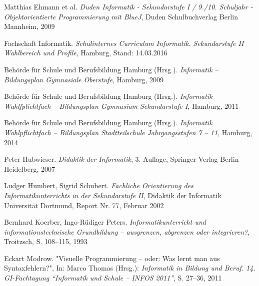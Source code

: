 \begin{thebibliography}{ABCDEF}
Matthias Ehmann et al. \emph{Duden Informatik - Sekundarstufe I / 9./10. Schuljahr - Objektorientierte Programmierung mit BlueJ}, Duden Schulbuchverlag Berlin Mannheim, 2009

Fachschaft Informatik. \emph{Schulinternes Curriculum Informatik. Sekundarstufe II Wahlbereich und Profile}, Hamburg, Stand: 14.03.2016


Behörde für Schule und Berufsbildung Hamburg (Hrsg.). \emph{Informatik -- Bildungsplan  Gymnasiale Oberstufe}, Hamburg, 2009

Behörde für Schule und Berufsbildung Hamburg (Hrsg.). \emph{Informatik Wahlfplichtfach -- Bildungsplan Gymnasium Sekundarstufe I}, Hamburg, 2011

Behörde für Schule und Berufsbildung Hamburg (Hrsg.). \emph{Informatik Wahlpflichtfach -- Bildungsplan Stadtteilschule Jahrgangsstufen 7 -- 11}, Hamburg, 2014

Peter Hubwieser. \emph{Didaktik der Informatik}, 3. Auflage, Springer-Verlag Berlin Heidelberg, 2007

Ludger Humbert, Sigrid Schubert. \emph{Fachliche Orientierung des Informatikunterrichts in der Sekundarstufe II}, Didaktik der Informatik Universität Dortmund, Report Nr. 77, Februar 2002

Bernhard Koerber, Ingo-Rüdiger Peters. \emph{Informatikunterricht und informationstechnische Grundbildung –
ausgrenzen, abgrenzen oder integrieren?}, Troitzsch, S. 108--115, 1993 

Eckart Modrow. "{Visuelle Programmierung -- oder: Was lernt man aus Syntaxfehlern?}", In: Marco Thomas (Hrsg.): \emph{Informatik in Bildung und Beruf. 14. GI-Fachtagung "`Informatik und Schule – INFOS 2011"'}, S. 27--36, 2011

%




\end{thebibliography}
